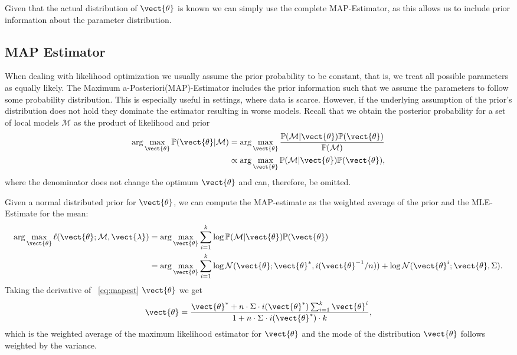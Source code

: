 Given that the actual distribution of $\vect{\theta}$ is known we can simply use the complete MAP-Estimator, as this allows us to include prior information about the parameter distribution.

\subsection{MAP Estimator}
When dealing with likelihood optimization we usually assume the prior probability to be constant, that is, we treat all possible parameters as equally likely.
The Maximum a-Posteriori(MAP)-Estimator includes the prior information such that we assume the parameters to follow some probability distribution.
This is especially useful in settings, where data is scarce.
However, if the underlying assumption of the prior's distribution does not hold they dominate the estimator resulting in worse models.
Recall that we obtain the posterior probability for a set of local models $\mathcal{M}$ as the product of likelihood and prior
\begin{equation}
    \begin{split}
    \arg\max_{\vect{\theta}}\mathbb{P}(\vect{\theta} \lvert \mathcal{M} ) &= \arg\max_{\vect{\theta}} \frac{\mathbb{P}(\mathcal{M}\lvert \vect{\theta}) \mathbb{P}(\vect{\theta}) }{\mathbb{P}(\mathcal{M})} \\
    &\propto  \arg\max_{\vect{\theta}}\mathbb{P}(\mathcal{M}\lvert \vect{\theta}) \mathbb{P}(\vect{\theta})  ,
    \end{split}
\end{equation}
where the denominator does not change the optimum \wrt $\vect{\theta}$ and can, therefore, be omitted.

Given a normal distributed prior for $\vect{\theta}$, we can  compute the MAP-estimate as the weighted average of the prior and the MLE-Estimate for the mean:
\begin{equation}
    \label{eq:mapest}
    \begin{split}
    \arg\max_{\vect{\theta}} \ell(\vect{\theta}; \mathcal{M}, \vect{\lambda}) &= \arg\max_{\vect{\theta}} \sum_{i=1}^k \log \mathbb{P}(\mathcal{M}\lvert \vect{\theta}) \mathbb{P}(\vect{\theta}) \\
    &= \arg\max_{\vect{\theta}} \sum_{i=1}^k   \log \mathcal{N}(\vect{\theta}; \vect{\theta}^*, i(\vect{\theta}^{-1}/n))+  \log \mathcal{N}(\vect{\theta}^i ; \vect{\theta}, \Sigma).
    \end{split}
\end{equation}
Taking the derivative of \eq~\ref{eq:mapest} \wrt $\vect{\theta}$ we get
\begin{equation}
    \vect{\theta} = \frac{\vect{\theta}^*  + n \cdot \Sigma \cdot i(\vect{\theta}^*) \sum_{i=1}^k \vect{\theta}^i}{1 + n \cdot \Sigma \cdot i(\vect{\theta}^*) \cdot k},
\end{equation}
which is the weighted average of the maximum likelihood estimator for $\vect{\theta}$ and the mode of the distribution $\vect{\theta}$ follows weighted by the variance.


